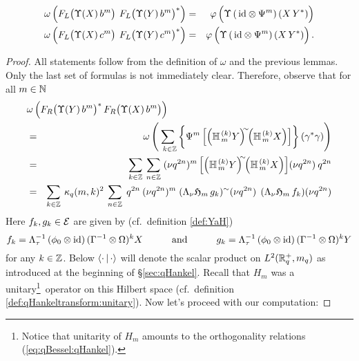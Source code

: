 \begin{lemma}
\begin{eqnarray}
   \omega \left(\vertL   F_L\! \left(\Upsilon(X)\, b^m \vertM\right) \:
                         F_L\! \left(\Upsilon(Y)\, b^m \vertM\right)^*   \right)
&=&
    \varphi \left(\Upsilon\left(\,\id \tens \Psi^m \right)(X \, Y^*) \vertL\right)
\label{eq:pre_plancherel:essence:Lb} \\
   \omega \left(\vertL   F_L\! \left(\Upsilon(X)\, c^m \vertM\right) \:
                         F_L\! \left(\Upsilon(Y)\, c^m \vertM\right)^*   \right)
&=&
    \varphi \left(\Upsilon\left(\,\id \tens \Psi^m \right)(X \, Y^*)  \vertL\right).
\label{eq:pre_plancherel:essence:Lc}
\end{eqnarray}
\end{lemma}


\begin{proof}
All statements follow from the definition of $\omega$ and the previous lemmas.
Only the last set of formulas is not immediately clear. Therefore, observe that
for all $m\in\NN$
\begin{eqnarray*}
\lefteqn{\omega \left(\vertL  F_R\!\left(\Upsilon(Y)\, b^m
\vertM\right)^* F_R\!
                \left(\Upsilon(X)\, b^m \vertM\right) \right)}  \\
&=&
    \omega \left(\sum_{\;\:k\in\ZZ} \left\{ \Psi^m
    \left[ \left(\YaH{m}{k}Y\right)^{\!\!\sim} \!\!
           \left(\YaH{m}{k}X\right)
    \right] \vertXL \! \right\}  (\gamma^*\gamma) \right) \\
&=&
    \sum_{k\in\ZZ}\: \sum_{n\in\ZZ} \; (\nu q^{2n})^m
    \left[ \left(\YaH{m}{k}Y\right)^{\!\!\sim} \!\! \left(\YaH{m}{k}X\right)
    \right] \! (\nu q^{2n})\: q^{2n}   \\
&=&
    \sum_{k\in\ZZ}\: \kq(m,k)^2 \:
    \sum_{n\in\ZZ}\; q^{2n} \: (\nu q^{2n})^m \;
    (\Lambda_\nu \holH{m} \,g_k)^\sim (\nu q^{2n}) \;\,
    (\Lambda_\nu \holH{m} \, f_k)(\nu q^{2n})
\end{eqnarray*}
Here $f_k, g_k \in \Hcore$ are given by (cf.\ definition \ref{def:YaH})
$$ f_k = \Lambda_\tau^{-1}\, (\evzero \tens \id)\, (\Gamma^{-1} \tens \Omega)^k X
                     \andspace{3em}
   g_k = \Lambda_\tau^{-1}\, (\evzero \tens \id)\, (\Gamma^{-1} \tens \Omega)^k Y  $$
for any $k\in \ZZ$.
Below $\scal{\cdot}{\cdot}$ will denote the scalar product on
$L^2(\RR_q^+,m_q)$ as introduced at the beginning of \S\ref{sec:qHankel}\@.
Recall that $H_m$ was a
unitary\footnote{Notice that unitarity of $H_m$ amounts to the orthogonality relations
(\ref{eq:qBessel:qHankel}).}\
operator on this Hilbert space (cf.\ definition \ref{def:qHankeltransform:unitary}).
Now let's proceed with our computation:

\end{proof}
